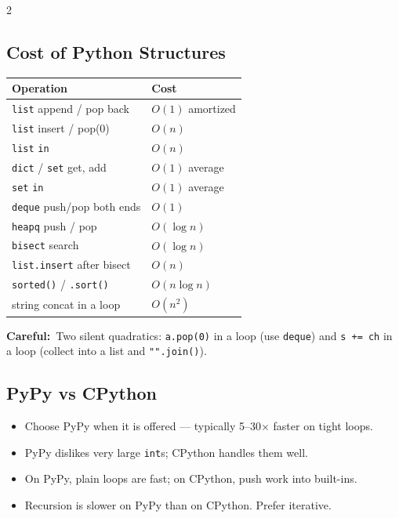 \documentclass[10pt]{article}
\newcommand{\code}[1]{\texttt{\small #1}}
\newcommand{\warn}[1]{{\color{warnc}\footnotesize\textbf{Careful:}}~{\footnotesize #1}\par}
\begin{document}
\begin{multicols}{2}
\subsection{Cost of Python Structures}
\begin{center}\footnotesize
\begin{tabular}{@{}ll@{}}
\toprule
\textbf{Operation} & \textbf{Cost} \\
\midrule
\code{list} append / pop back   & $O(1)$ amortized \\
\code{list} insert / pop(0)     & $O(n)$ \\
\code{list} \code{in}           & $O(n)$ \\
\code{dict} / \code{set} get, add & $O(1)$ average \\
\code{set} \code{in}            & $O(1)$ average \\
\code{deque} push/pop both ends & $O(1)$ \\
\code{heapq} push / pop         & $O(\log n)$ \\
\code{bisect} search            & $O(\log n)$ \\
\code{list.insert} after bisect & $O(n)$ \\
\code{sorted()} / \code{.sort()}& $O(n \log n)$ \\
string concat in a loop         & $O(n^2)$ \\
\bottomrule
\end{tabular}
\end{center}
\warn{Two silent quadratics: \code{a.pop(0)} in a loop (use
\code{deque}) and \code{s += ch} in a loop (collect into a list and
\code{"".join()}).}

\subsection{PyPy vs CPython}
\begin{itemize}
    \item Choose PyPy when it is offered --- typically 5--30$\times$
          faster on tight loops.
    \item PyPy dislikes very large \code{int}s; CPython handles them
          well.
    \item On PyPy, plain loops are fast; on CPython, push work into
          built-ins.
    \item Recursion is slower on PyPy than on CPython. Prefer iterative.
\end{itemize}

\end{multicols}
\end{document}
